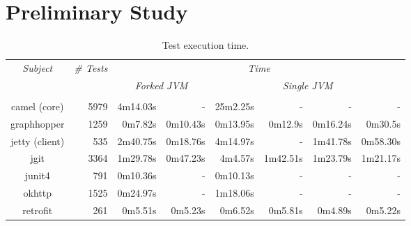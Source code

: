 \section{Preliminary Study}

\begin{table*}[t]
  \centering
  \begin{tabular}{|c|r|r|r|r|r|r|r|}
    \hline
    \multirow{2}{*}{\emph{Subject}} & \multirow{2}{*}{\emph{\# Tests}} &  \multicolumn{6}{c|}{\emph{Time}}\\
    \cline{3-8}
    & & \multicolumn{2}{c|}{\emph{Forked JVM}} & \multicolumn{4}{c|}{\emph{Single JVM}}   \\
    \cline{3-8}
    & & \multicolumn{1}{c|}{\Seq{}} & \multicolumn{1}{c|}{\ParClassSeqMeth{}} & \multicolumn{1}{c|}{\Seq{}} & \multicolumn{1}{c|}{\ParClassSeqMeth{}} & \multicolumn{1}{c|}{\SeqClassParMeth{}} & \multicolumn{1}{c|}{\ParClassParMeth{}}\\     \hline
    camel (core) & 5979 & 4m14.03s & - & 25m2.25s & - & - & - \\
    \hline
    graphhopper & 1259 & 0m7.82s & 0m10.43s & 0m13.95s & 0m12.9s & 0m16.24s & 0m30.5s \\
    \hline
    jetty (client) & 535 & 2m40.75s & 0m18.76s & 4m14.97s & - & 1m41.78s & 0m58.30s \\
    \hline
    jgit & 3364 & 1m29.78s & 0m47.23s & 4m4.57s & 1m42.51s & 1m23.79s & 1m21.17s \\
    \hline
    junit4 & 791 & 0m10.36s & - & 0m10.13s & - & - & - \\
    \hline
    okhttp & 1525 & 0m24.97s & - & 1m18.06s & - & - & - \\
    \hline
    retrofit & 261 & 0m5.51s & 0m5.23s & 0m6.52s & 0m5.81s & 0m4.89s & 0m5.22s \\
    \hline
  \end{tabular}
  \caption{\label{table:cost}Test execution time.}
\end{table*}


